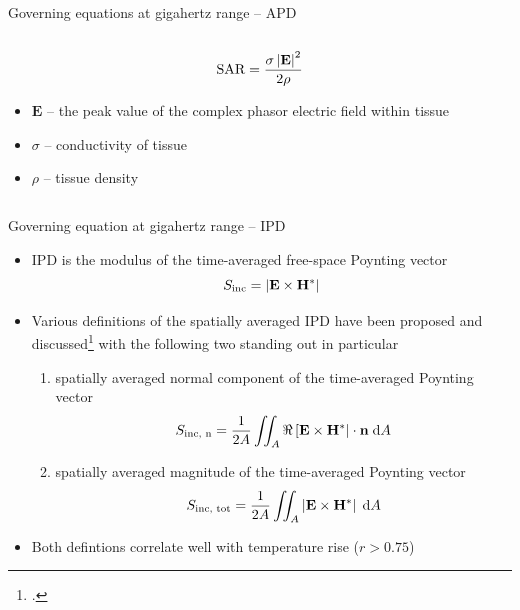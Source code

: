 \documentclass[xcolor=dvipsnames,10pt]{beamer}
\begin{document}
\begin{frame}{Governing equations at gigahertz range -- APD}
\begin{columns}[c]
\begin{column}{0.6\textwidth}
\begin{onlyenv}
                \begin{equation*}
                    \centering
                    \text{SAR} = \frac{\sigma \left| \mathbf{E} \right|^2}{2\rho}
                \end{equation*}
                \begin{itemize}
                    \item $\mathbf{E}$ -- the peak value of the complex phasor electric field within tissue
                    \item $\sigma$ -- conductivity of tissue
                    \item $\rho$ -- tissue density 
                \end{itemize}
            \end{onlyenv}
        \end{column}
    \end{columns}
\end{frame}

\begin{frame}{Governing equation at gigahertz range -- IPD}
    \begin{itemize}
        \item IPD is the modulus of the time-averaged free-space Poynting vector
        \begin{equation*}
            \centering
            S_\text{inc} = \left| \mathbf{E} \times \mathbf{H}^* \right|
        \end{equation*}
        \item Various definitions of the spatially averaged IPD have been proposed and discussed\footcite{IEEE2021Guide} with the following two standing out in particular
        \begin{enumerate}
            \item spatially averaged normal component of the time-averaged Poynting vector
            \begin{equation*}
                \centering
                S_\text{inc, n} = \frac{1}{2A} \iint_{A} \Re \left[ \mathbf{E} \times \mathbf{H}^* \right| \cdot \mathbf{n} \; \mathrm{d}A
            \end{equation*}
            \item spatially averaged magnitude of the time-averaged Poynting vector
            \begin{equation*}
                \centering
                S_\text{inc, tot} = \frac{1}{2A} \iint_{A} \left| \mathbf{E} \times \mathbf{H}^* \right| \; \mathrm{d}A
            \end{equation*}
        \end{enumerate}
        \item Both defintions correlate well with temperature rise ($r > 0.75$)
    \end{itemize}
\end{frame}
\end{document}

